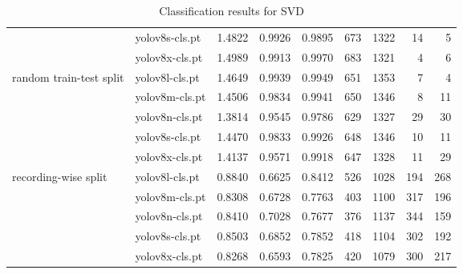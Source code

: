 \begin{table}
\begin{tabular}{llrrrrrrr}
			 & yolov8s-cls.pt & 1.4822 & 0.9926 & 0.9895 & 673 & 1322 & 14 & 5 \\
			 & yolov8x-cls.pt & 1.4989 & 0.9913 & 0.9970 & 683 & 1321 & 4 & 6 \\
			\midrule
			\multirow{5}{10em}{random train-test split} & yolov8l-cls.pt & 1.4649 & 0.9939 & 0.9949 & 651 & 1353 & 7 & 4 \\
			 & yolov8m-cls.pt & 1.4506 & 0.9834 & 0.9941 & 650 & 1346 & 8 & 11 \\
			 & yolov8n-cls.pt & 1.3814 & 0.9545 & 0.9786 & 629 & 1327 & 29 & 30 \\
			 & yolov8s-cls.pt & 1.4470 & 0.9833 & 0.9926 & 648 & 1346 & 10 & 11 \\
			 & yolov8x-cls.pt & 1.4137 & 0.9571 & 0.9918 & 647 & 1328 & 11 & 29 \\
			\midrule
			\multirow{5}{10em}{recording-wise split} & yolov8l-cls.pt & 0.8840 & 0.6625 & 0.8412 & 526 & 1028 & 194 & 268 \\
			 & yolov8m-cls.pt & 0.8308 & 0.6728 & 0.7763 & 403 & 1100 & 317 & 196 \\
			 & yolov8n-cls.pt & 0.8410 & 0.7028 & 0.7677 & 376 & 1137 & 344 & 159 \\
			 & yolov8s-cls.pt & 0.8503 & 0.6852 & 0.7852 & 418 & 1104 & 302 & 192 \\
			 & yolov8x-cls.pt & 0.8268 & 0.6593 & 0.7825 & 420 & 1079 & 300 & 217 \\
        \bottomrule
    \end{tabular}
    \caption{Classification results for SVD}
    \label{tab:svd_results}
\end{table}